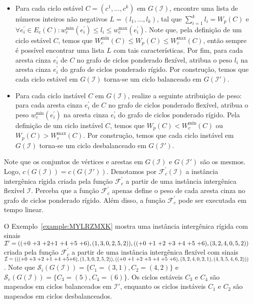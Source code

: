 \begin{itemize}
  \item Para cada ciclo estável $C=(c^1,\dots,c^k)$ em $G(\mathcal{I})$, encontre uma lista de números inteiros não negativos $L=(l_1,\dots,l_k)$, tal que $\sum_{i=1}^{k}l_i = W_p(C)$ e $\forall e^{\prime}_i \in E_c(C): w^{\min}_c(e^{\prime}_i) \le l_i \le w^{\max}_c(e^{\prime}_i)$. Note que, pela definição de um ciclo estável $C$, temos que $W^{\min}_c(C) \le W_p(C) \le W^{\max}_c(C)$, então sempre é possível encontrar uma lista $L$ com tais características. Por fim, para cada aresta cinza $e^{\prime}_i$ de $C$ no grafo de ciclos ponderado flexível, atribua o peso $l_i$ na aresta cinza $e^{\prime}_i$ do grafo de ciclos ponderado rígido. Por construção, temos que cada ciclo estável em $G(\mathcal{I})$ torna-se um ciclo balanceado em $G(\mathcal{I}')$.
  \item Para cada ciclo instável $C$ em $G(\mathcal{I})$, realize a seguinte atribuição de peso: para cada aresta cinza $e^{\prime}_i$ de $C$ no grafo de ciclos ponderado flexível, atribua o peso $w^{\min}_c(e^{\prime}_i)$ na aresta cinza $e^{\prime}_i$ do grafo de ciclos ponderado rígido. Pela definição de um ciclo instável $C$, temos que $W_p(C)  < W^{\min}_c(C)$ ou $W_p(C) > W^{\max}_c(C)$. Por construção, temos que cada ciclo instável em $G(\mathcal{I})$ torna-se um ciclo desbalanceado em $G(\mathcal{I}')$.
\end{itemize}

Note que os conjuntos de vértices e arestas em $G(\mathcal{I})$ e $G(\mathcal{I}')$ são os mesmos. Logo, $c(G(\mathcal{I})) = c(G(\mathcal{I}'))$. Denotamos por $\mathcal{F}_{c}^{'}(\mathcal{I})$ a instância intergênica rígida criada pela função $\mathcal{F}_{c}^{'}$ a partir de uma instância intergênica flexível $\mathcal{I}$. Perceba que a função $\mathcal{F}_{c}^{'}$ apenas define o peso de cada aresta cinza no grafo de ciclos ponderado rígido. Além disso, a função $\mathcal{F}_{c}^{'}$ pode ser executada em tempo linear.

O Exemplo~\ref{example:MYLRZMXK} mostra uma instância intergênica rígida com sinais $\mathcal{I}' = (({+0}~{+3}~{+2}\break{+1}~{+4}~{+5}~{+6}),(1,3,0,2,5,2)),(({+0}~{+1}~{+2}~{+3}~{+4}~{+5}~{+6}),(3,2,4,0,5,2))$ criada pela função $\mathcal{F}_{c}^{'}$ a partir de uma instância intergênica flexível com sinais $\mathcal{I} = ((({+0}~{+3}~{+2}~{+1}~{+4}~{+5}\break{+6}),(1,3,0,2,5,2)),(({+0}~{+1}~{+2}~{+3}~{+4}~{+5}~{+6}),(3,2,4,0,2,1),(4,3,5,4,6,2)))$. Note que $\mathcal{S}_i(G(\mathcal{I})) = \{C_1=(3,1),C_2=(4,2)\}$ e $\mathcal{S}_e(G(\mathcal{I})) = \{C_3=(5),C_4=(6)\}$. Os ciclos estáveis $C_3$ e $C_4$ são mapeados em ciclos balanceados em $\mathcal{I}'$, enquanto os ciclos instáveis $C_1$ e $C_2$ são mapeados em ciclos desbalanceados.

